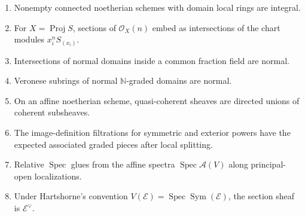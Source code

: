 \documentclass[11pt]{amsart}
\DeclareMathOperator{\Spec}{Spec}
\DeclareMathOperator{\Proj}{Proj}
\DeclareMathOperator{\Sym}{Sym}
\newcommand{\OO}{\mathcal O}
\newcommand{\A}{\mathscr A}
\newcommand{\E}{\mathscr E}
\theoremstyle{plain}
\theoremstyle{definition}
\theoremstyle{remark}
\begin{document}
\begin{enumerate}[label=\textup{(\arabic*)}]
  \item Nonempty connected noetherian schemes with domain local rings are integral.
  \item For $X=\Proj S$, sections of $\OO_X(n)$ embed as intersections of the chart modules $x_i^nS_{(x_i)}$.
  \item Intersections of normal domains inside a common fraction field are normal.
  \item Veronese subrings of normal $\mathbb N$-graded domains are normal.
  \item On an affine noetherian scheme, quasi-coherent sheaves are directed unions of coherent subsheaves.
  \item The image-definition filtrations for symmetric and exterior powers have the expected associated graded pieces after local splitting.
  \item Relative $\Spec$ glues from the affine spectra $\Spec\A(V)$ along principal-open localizations.
  \item Under Hartshorne's convention $V(\E)=\Spec\Sym(\E)$, the section sheaf is $\E^\vee$.
\end{enumerate}
\end{document}
